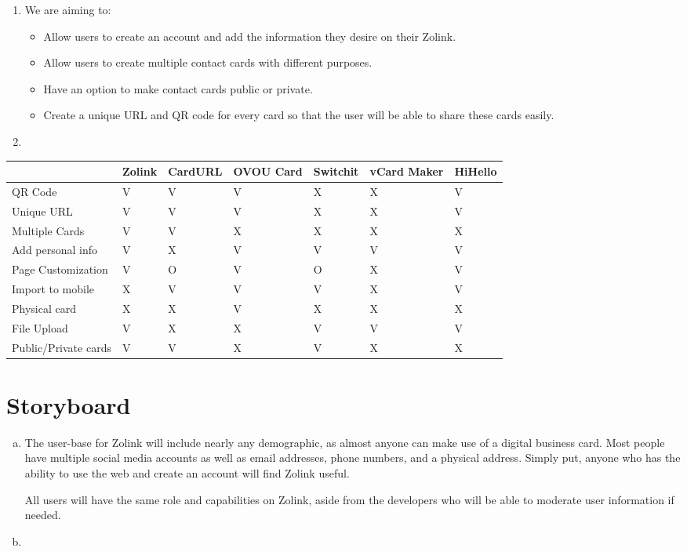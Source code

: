 \documentclass[12pt]{article}%
\begin{document}
\begin{enumerate}[2.a.]
        \item We are aiming to:
        \begin{itemize}
        	\item Allow users to create an account and add the information they desire on their Zolink.
        	\item Allow users to create multiple contact cards with different purposes.
        	\item Have an option to make contact cards public or private.
        	\item Create a unique URL and QR code for every card so that the user will be able to share these cards easily.
        \end{itemize}
        \item
    \end{enumerate}

\begin{center}
    \begin{tabular}{|l|l|l|l|l|l|l|}
        \hline
         & Zolink & CardURL & OVOU Card & Switchit & vCard Maker & HiHello \\
         \hline
        QR Code & V & V & V & X & X & V \\
        \hline
        Unique URL & V & V & V & X & X & V \\
        \hline
        Multiple Cards & V & V & X & X & X & X \\
        \hline
        Add personal info & V & X & V & V & V & V \\
        \hline
        Page Customization & V & O & V & O & X & V \\
        \hline
        Import to mobile & X & V & V & V & X & V \\
        \hline
        Physical card & X & X & V & X & X & X \\
        \hline
        File Upload & V & X & X & V & V & V \\
        \hline
        Public/Private cards & V & V & X & V & X & X \\
        \hline
    \end{tabular}
\end{center}

\clearpage
\section{Storyboard} 

\begin{enumerate}[a.]
    \item The user-base for Zolink will include nearly any demographic, as almost anyone can make use of a digital business card. Most people have multiple social media accounts as well as email addresses, phone numbers, and a physical address. Simply put, anyone who has the ability to use the web and create an account will find Zolink useful. 
    
    All users will have the same role and capabilities on Zolink, aside from the developers who will be able to moderate user information if needed.
    
    \item
\end{enumerate}
\end{document}
